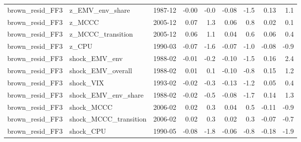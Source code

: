 \begin{table}
\begin{tabular}{lllrrrrrr}
brown\_resid\_FF3 & z\_EMV\_env\_share & 1987-12 & -0.00 & -0.0 & -0.08 & -1.5 & 0.13 & 1.1 \\
brown\_resid\_FF3 & z\_MCCC & 2005-12 & 0.07 & 1.3 & 0.06 & 0.8 & 0.02 & 0.1 \\
brown\_resid\_FF3 & z\_MCCC\_transition & 2005-12 & 0.06 & 1.1 & 0.04 & 0.6 & 0.06 & 0.4 \\
brown\_resid\_FF3 & z\_CPU & 1990-03 & -0.07 & -1.6 & -0.07 & -1.0 & -0.08 & -0.9 \\
brown\_resid\_FF3 & shock\_EMV\_env & 1988-02 & -0.01 & -0.2 & -0.10 & -1.5 & 0.16 & 2.4 \\
brown\_resid\_FF3 & shock\_EMV\_overall & 1988-02 & 0.01 & 0.1 & -0.10 & -0.8 & 0.15 & 1.2 \\
brown\_resid\_FF3 & shock\_VIX & 1993-02 & -0.02 & -0.3 & -0.13 & -1.2 & 0.05 & 0.4 \\
brown\_resid\_FF3 & shock\_EMV\_env\_share & 1988-02 & -0.02 & -0.5 & -0.08 & -1.7 & 0.14 & 1.3 \\
brown\_resid\_FF3 & shock\_MCCC & 2006-02 & 0.02 & 0.3 & 0.04 & 0.5 & -0.11 & -0.9 \\
brown\_resid\_FF3 & shock\_MCCC\_transition & 2006-02 & 0.02 & 0.3 & 0.02 & 0.3 & -0.07 & -0.7 \\
brown\_resid\_FF3 & shock\_CPU & 1990-05 & -0.08 & -1.8 & -0.06 & -0.8 & -0.18 & -1.9 \\
\bottomrule
\end{tabular}
\end{table}
